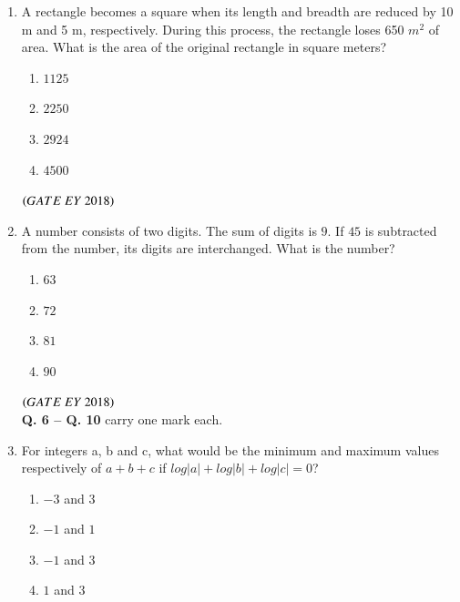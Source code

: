 \documentclass[journal]{IEEEtran}
\numberwithin{equation}{enumi}
\numberwithin{figure}{enumi}
\begin{document}
\begin{enumerate}
\begin{multicols}{4}
\begin{enumerate}
    \item $1$
    \item $7$
    \item $100$
    \item $700$
\end{enumerate}
\end{multicols}
\hfill{$\brak{ GATE\ EY\ 2018}$}
\bigskip
\item A rectangle becomes a square when its length and breadth are reduced by 10 m and 5 m, respectively. During this process, the rectangle loses 650 $m^2$ of area. What is the area of the original rectangle in square meters?
\begin{multicols}{4}
\begin{enumerate}
    \item $1125$
    \item $2250$
    \item $2924$
    \item $4500$
\end{enumerate}
\end{multicols}
\hfill{$\brak{ GATE\ EY\ 2018}$}
\bigskip
\item A number consists of two digits. The sum of digits is $9$. If $45$ is subtracted from the number, its digits are interchanged. What is the number?
\begin{multicols}{4}
\begin{enumerate}
    \item $63$
    \item $72$
    \item $81$
    \item $90$
\end{enumerate}
\end{multicols}
\hfill{$\brak{ GATE\ EY\ 2018}$}
\bigskip
\\
\noindent \textbf{Q. 6 -- Q. \textbf{10}} carry one mark each.
\\
\item For integers a, b and c, what would be the minimum and maximum values respectively of $a+b+c$ if $log|a|+log|b|+log|c|=0$?
\begin{multicols}{4}
\begin{enumerate}
    \item $-3$ and $3$
    \item $-1$ and $1$
    \item $-1$ and $3$
    \item $1$ and $3$
\end{enumerate}

\end{multicols}
\end{enumerate}
\end{document}
